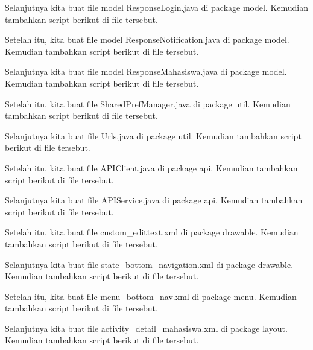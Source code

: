 Selanjutnya kita buat file model ResponseLogin.java di package model. Kemudian tambahkan script berikut di file tersebut.


Setelah itu, kita buat file model ResponseNotification.java di package model. Kemudian tambahkan script berikut di file tersebut.


Selanjutnya kita buat file model ResponseMahasiswa.java di package model. Kemudian tambahkan script berikut di file tersebut.


Setelah itu, kita buat file SharedPrefManager.java di package util. Kemudian tambahkan script berikut di file tersebut.


Selanjutnya kita buat file Urls.java di package util. Kemudian tambahkan script berikut di file tersebut.


Setelah itu, kita buat file APIClient.java di package api. Kemudian tambahkan script berikut di file tersebut.


Selanjutnya kita buat file APIService.java di package api. Kemudian tambahkan script berikut di file tersebut.


Setelah itu, kita buat file custom\_edittext.xml di package drawable. Kemudian tambahkan script berikut di file tersebut.


Selanjutnya kita buat file state\_bottom\_navigation.xml di package drawable. Kemudian tambahkan script berikut di file tersebut.


Setelah itu, kita buat file menu\_bottom\_nav.xml di package menu. Kemudian tambahkan script berikut di file tersebut.


Selanjutnya kita buat file activity\_detail\_mahasiswa.xml di package layout. Kemudian tambahkan script berikut di file tersebut.



